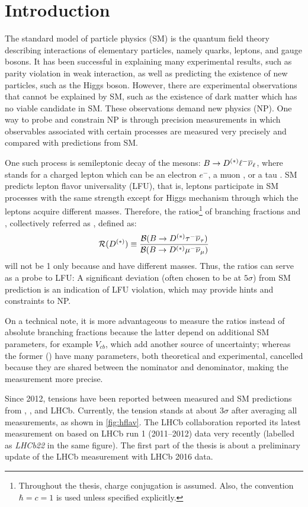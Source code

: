 \chapter{Introduction}
\label{ref:intro}

The standard model of particle physics (SM)
is the quantum field theory describing interactions of elementary particles,
namely quarks, leptons, and gauge bosons.
It has been successful in explaining many experimental results, such as parity
violation in weak interaction,
as well as predicting the existence of new particles, such as the Higgs boson.
However,
there are experimental observations that cannot be explained by SM,
such as the existence of dark matter
which has no viable candidate in SM.
These observations demand new physics (NP).
One way to probe and constrain NP is through precision measurements
in which observables associated with certain processes are measured very
precisely and compared with predictions from SM.

One such process is semileptonic decay of the \B mesons:
$B \rightarrow D^{(*)} {\ell^-} {{\overline{\nu}}_\ell}$,
where \ellm stands for a charged lepton which can be an electron $e^-$,
a muon \mun, or a tau \taum.
SM predicts lepton flavor universality (LFU),
that is, leptons participate in SM processes with the same strength
except for Higgs mechanism through which the leptons acquire different masses.
Therefore,
the ratios\footnote{
    Throughout the thesis, charge conjugation is assumed.
    Also, the convention $\hbar = c = 1$ is used unless specified explicitly.
} of branching fractions \RD and \RDst,
collectively referred as \RDX, defined as:
\begin{equation}
    \mathcal{R}(D^{(*)}) \equiv \frac{\mathcal{B}(B \rightarrow D^{(*)} {\tau^-} {{\overline{\nu}}_\tau})}{\mathcal{B}(B \rightarrow D^{(*)} {\mu^-} {{\overline{\nu}}_\mu})}
\end{equation}
will not be 1 only because \taum and \mun have different masses.
Thus, the ratios can serve as a probe to LFU:
A significant deviation (often chosen to be at $5\sigma$) from SM prediction is
an indication of LFU violation,
which may provide hints and constraints to NP.

On a technical note,
it is more advantageous to measure the ratios instead of absolute
branching fractions because the latter depend on additional SM parameters,
for example $V_{cb}$,
which add another source of uncertainty;
whereas the former (\RDX) have many parameters, both theoretical and
experimental, cancelled because they are shared between the nominator and
denominator, making the measurement more precise.

Since 2012, tensions have been reported between measured \RDX and SM
predictions from \babar, \belle, and LHCb.
Currently, the tension stands at about $3 \sigma$ after averaging all
measurements,
as shown in \cref{fig:hflav}.
The LHCb collaboration reported its latest measurement on \RDX based on LHCb run
1 (2011--2012) data very recently
(labelled as \emph{LHCb22} in the same figure).
The first part of the thesis is about a preliminary update of the LHCb \RDX
measurement with LHCb 2016 data.

